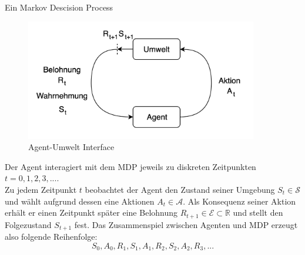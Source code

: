 Ein Markov Descision Process

\begin{figure}[H]
    \centering
    \includegraphics[height=200px]{images/agentUmweltInterface.png}
    \caption{ Agent-Umwelt Interface}
\end{figure}



Der Agent interagiert mit dem MDP jeweils zu diskreten Zeitpunkten $t = 0, 1, 2, 3, ...$. \\
Zu jedem Zeitpunkt $t$ beobachtet der Agent den Zustand seiner Umgebung $S_t \in \mathcal{S}$ und wählt aufgrund dessen eine Aktionen $A_t \in \mathcal{A}$. Als Konsequenz seiner Aktion erhält er einen Zeitpunkt später eine Belohnung $R_{t+1} \in \mathcal{E} \subset\mathbb{R} $ und stellt den Folgezustand $S_{t+1}$ fest. Das Zusammenspiel zwischen Agenten und MDP erzeugt also folgende Reihenfolge:
\[S_0, A_0, R_1, S_1, A_1, R_2, S_2, A_2, R_3, ...\]

